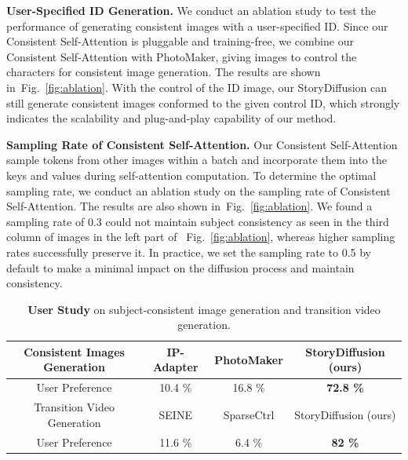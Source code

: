 \documentclass{article} %
\newcommand{\nameofmethod}{StoryDiffusion}
\newcommand{\nameofsa}{Consistent Self-Attention}
\renewcommand{\figref}[1]{Fig.~\ref{#1}}
\newcommand{\myPara}[1]{\vspace{6pt}\noindent\textbf{#1}}
\begin{document}
\myPara{User-Specified ID Generation.} We conduct an ablation study to test the performance of generating consistent images with a user-specified ID. Since our \nameofsa{} is pluggable and training-free, we combine our \nameofsa{} with PhotoMaker, giving images to control the characters for consistent image generation.  The results are shown in~\figref{fig:ablation}.
%
With the control of the ID image, our \nameofmethod{} can still generate consistent images conformed to the given control ID, which strongly indicates the scalability and plug-and-play capability of our method.

\myPara{Sampling Rate of \nameofsa{}.} Our \nameofsa{} sample tokens from other images within a batch and incorporate them into the keys and values during self-attention computation. To determine the optimal sampling rate, we conduct an ablation study on the sampling rate of \nameofsa{}. The results are also shown in~\figref{fig:ablation}. We found a sampling rate of 0.3 could not maintain subject consistency as seen in the third column of images in the left part of ~\figref{fig:ablation}, whereas higher sampling rates successfully preserve it.
%
In practice, we set the sampling rate to 0.5 by default to make a minimal impact on the diffusion process and maintain consistency.

\begin{table}[!t]
\caption{\textbf{User Study} on subject-consistent image generation and transition video generation.}
\centering
\tabcolsep=14pt
\renewcommand\arraystretch{1.2}
\setlength\arrayrulewidth{1pt}
\small
\begin{tabular}{cccc}
\hline
Consistent Images Generation & IP-Adapter & PhotoMaker  & \nameofmethod{} (ours)  \\ 
\hline
User Preference & 10.4 \% & 16.8 \% & \textbf{72.8 \%}\\
\hline \hline
Transition Video Generation & SEINE & SparseCtrl  & \nameofmethod{} (ours)  \\ 
\hline
User Preference & 11.6 \% & 6.4 \% &  \textbf{82 \%}\\
\hline
\end{tabular}
\label{tab:huamn_eval_overall}
\end{table}
\end{document}
